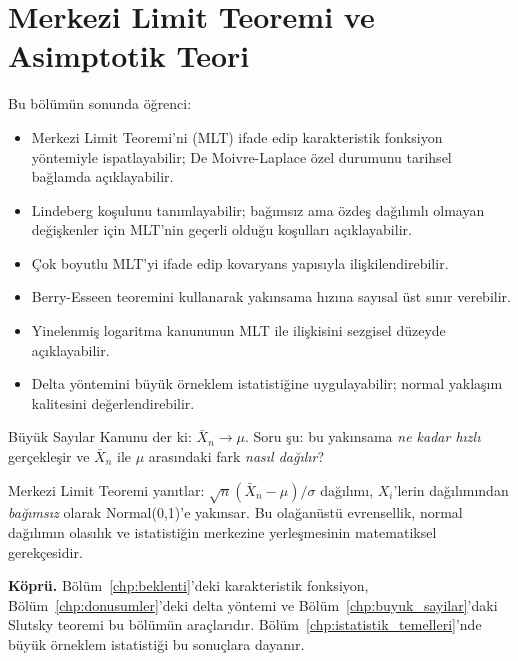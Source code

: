 \chapter{Merkezi Limit Teoremi ve Asimptotik Teori}
\label{chp:merkezi_limit}


\begin{kazanimlar}
Bu bölümün sonunda öğrenci:
\begin{itemize}
  \item Merkezi Limit Teoremi'ni (MLT) ifade edip karakteristik fonksiyon yöntemiyle ispatlayabilir;
        De Moivre-Laplace özel durumunu tarihsel bağlamda açıklayabilir.
  \item Lindeberg koşulunu tanımlayabilir; bağımsız ama özdeş dağılımlı olmayan
        değişkenler için MLT'nin geçerli olduğu koşulları açıklayabilir.
  \item Çok boyutlu MLT'yi ifade edip kovaryans yapısıyla ilişkilendirebilir.
  \item Berry-Esseen teoremini kullanarak yakınsama hızına sayısal üst sınır verebilir.
  \item Yinelenmiş logaritma kanununun MLT ile ilişkisini sezgisel düzeyde açıklayabilir.
  \item Delta yöntemini büyük örneklem istatistiğine uygulayabilir;
        normal yaklaşım kalitesini değerlendirebilir.
\end{itemize}
\end{kazanimlar}

\begin{motivasyon}
Büyük Sayılar Kanunu der ki: $\bar{X}_n \to \mu$. Soru şu: bu yakınsama \emph{ne kadar hızlı}
gerçekleşir ve $\bar{X}_n$ ile $\mu$ arasındaki fark \emph{nasıl dağılır}?

Merkezi Limit Teoremi yanıtlar: $\sqrt{n}(\bar{X}_n - \mu)/\sigma$ dağılımı,
$X_i$'lerin dağılımından \emph{bağımsız} olarak Normal(0,1)'e yakınsar.
Bu olağanüstü evrensellik, normal dağılımın olasılık ve istatistiğin merkezine
yerleşmesinin matematiksel gerekçesidir.

\medskip
\textbf{Köprü.} Bölüm~\ref{chp:beklenti}'deki karakteristik fonksiyon,
Bölüm~\ref{chp:donusumler}'deki delta yöntemi ve Bölüm~\ref{chp:buyuk_sayilar}'daki
Slutsky teoremi bu bölümün araçlarıdır.
Bölüm~\ref{chp:istatistik_temelleri}'nde büyük örneklem istatistiği bu sonuçlara dayanır.
\end{motivasyon}

